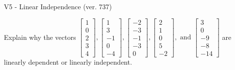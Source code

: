 \begin{exercise}
  \begin{exerciseTitle}V5 - Linear Independence (ver. 737)\end{exerciseTitle}
  \begin{exerciseStatement}
    Explain why the vectors \(\left[\begin{array}{r}
1 \\
0 \\
2 \\
3 \\
4
\end{array}\right] , \left[\begin{array}{r}
1 \\
3 \\
-1 \\
0 \\
-4
\end{array}\right] , \left[\begin{array}{r}
-2 \\
-3 \\
-1 \\
-3 \\
0
\end{array}\right] , \left[\begin{array}{r}
2 \\
1 \\
0 \\
5 \\
-2
\end{array}\right] , \text{ and } \left[\begin{array}{r}
3 \\
0 \\
-9 \\
-8 \\
-14
\end{array}\right]\) are linearly dependent or linearly independent.	



\end{exerciseStatement}
\end{exercise}

